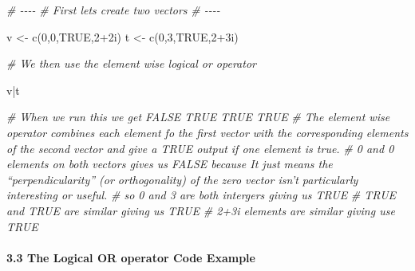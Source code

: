 \documentclass[
]{article}
\newenvironment{Shaded}{\begin{snugshade}}{\end{snugshade}}
\newcommand{\CommentTok}[1]{\textcolor[rgb]{0.56,0.35,0.01}{\textit{#1}}}
\newcommand{\ConstantTok}[1]{\textcolor[rgb]{0.00,0.00,0.00}{#1}}
\newcommand{\DecValTok}[1]{\textcolor[rgb]{0.00,0.00,0.81}{#1}}
\newcommand{\FunctionTok}[1]{\textcolor[rgb]{0.00,0.00,0.00}{#1}}
\newcommand{\NormalTok}[1]{#1}
\newcommand{\OtherTok}[1]{\textcolor[rgb]{0.56,0.35,0.01}{#1}}
\newcommand{\SpecialCharTok}[1]{\textcolor[rgb]{0.00,0.00,0.00}{#1}}
\begin{document}
\begin{Shaded}
\begin{Highlighting}[]
\CommentTok{\# {-}{-}{-}{-}}
\CommentTok{\# First let\textquotesingle{}s create two vectors}
\CommentTok{\# {-}{-}{-}{-}}

\NormalTok{v }\OtherTok{\textless{}{-}} \FunctionTok{c}\NormalTok{(}\DecValTok{0}\NormalTok{,}\DecValTok{0}\NormalTok{,}\ConstantTok{TRUE}\NormalTok{,}\DecValTok{2}\SpecialCharTok{+}\NormalTok{2i) }
\NormalTok{t }\OtherTok{\textless{}{-}} \FunctionTok{c}\NormalTok{(}\DecValTok{0}\NormalTok{,}\DecValTok{3}\NormalTok{,}\ConstantTok{TRUE}\NormalTok{,}\DecValTok{2}\SpecialCharTok{+}\NormalTok{3i)}

\CommentTok{\# We then use the element wise logical or operator}

\NormalTok{v}\SpecialCharTok{|}\NormalTok{t}

\CommentTok{\# When we run this we get FALSE  TRUE  TRUE  TRUE}
\CommentTok{\# The element wise operator combines each element fo the first vector with the corresponding elements of the second vector and give a TRUE output if one element is true.}
\CommentTok{\# 0 and 0 elements on both vectors gives us FALSE because  It just means the “perpendicularity” (or orthogonality) of the zero vector isn’t particularly interesting or useful.}
\CommentTok{\# so 0 and 3 are both intergers giving us TRUE}
\CommentTok{\# TRUE and TRUE are similar giving us TRUE}
\CommentTok{\# 2+3i elements are similar giving use TRUE}

\end{Highlighting}
\end{Shaded}

\hypertarget{the-logical-or-operator-code-example}{%
\paragraph{3.3 The Logical OR operator Code
Example}\label{the-logical-or-operator-code-example}}
\end{document}
